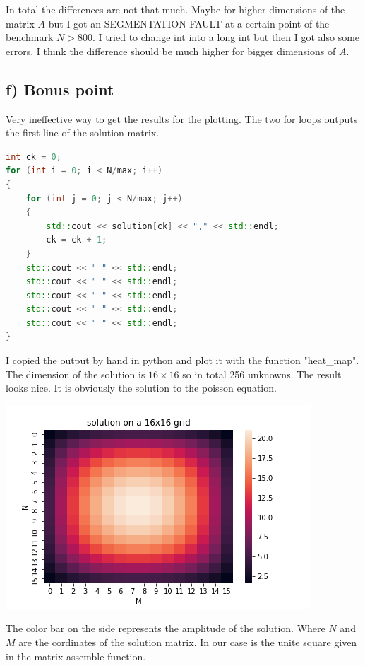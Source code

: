 \documentclass[11pt,a4paper]{article}
\begin{document}
\noindent
In total the differences are not that much. Maybe for higher dimensions of the matrix $A$ but I got an SEGMENTATION FAULT at a certain point of the benchmark $N > 800$. I tried to change int into a long int but then I got also some errors. I think the difference should be much higher for bigger dimensions of $A$.
\newpage
\subsection*{f) Bonus point}
Very ineffective way to get the results for the plotting. The two for loops outputs the first line of the solution matrix. 
\begin{lstlisting}[language=C++, caption={kernel for serching for zeros)}]
int ck = 0; 
for (int i = 0; i < N/max; i++)
{
	for (int j = 0; j < N/max; j++)
	{
		std::cout << solution[ck] << "," << std::endl;
		ck = ck + 1;
	}
	std::cout << " " << std::endl;  
	std::cout << " " << std::endl;
	std::cout << " " << std::endl;
	std::cout << " " << std::endl;
	std::cout << " " << std::endl;
}
\end{lstlisting}
I copied the output by hand in python and plot it with the function "heat\_map". The dimension of the solution is $16\times16$ so in total 256 unknowns. The result looks nice. It is obviously the solution to the poisson equation.   
\begin{center}
	
	\begin{minipage}[t]{1\textwidth}
		\includegraphics[width=\textwidth]{Bilder/solution_16x16}
	\end{minipage}
	
\end{center}
The color bar on the side represents the amplitude of the solution.
Where $N$ and $M$ are the cordinates of the solution matrix. In our case is the unite square given in the matrix assemble function.
 
\end{document}
